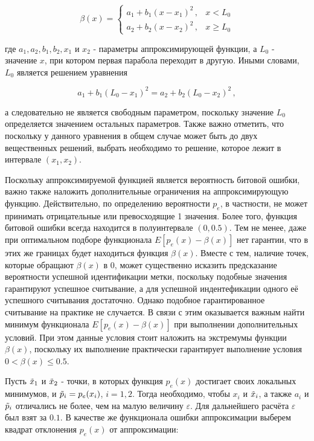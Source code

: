 \documentclass[12pt]{article}
\theoremstyle{definition}
\begin{document}
\begin{equation}
    \beta(x) = \begin{cases}
        a_1+b_1(x-x_1)^2\,, & x<L_0 \\
        a_2+b_2(x-x_2)^2\,, & x\geq L_0
    \end{cases}
\end{equation}

где $a_1, a_2, b_1, b_2, x_1$ и $x_2$ - параметры аппроксимирующей функции, а $L_0$ - значение $x$, при котором первая парабола переходит в другую. Иными словами, $L_0$ является решением уравнения 

\begin{equation}
    a_1+b_1(L_0-x_1)^2 = a_2+b_2(L_0-x_2)^2\,,
\end{equation}

а следовательно не является свободным параметром, поскольку значение $L_0$ определяется значением остальных параметров. Также важно отметить, что поскольку у данного уравнения в общем случае может быть до двух вещественных решений, выбрать необходимо то решение, которое лежит в интервале $(x_1,x_2)$.

Поскольку аппроксимируемой функцией является вероятность битовой ошибки, важно также наложить дополнительные ограничения на аппроксимирующую функцию. Действительно, по определению вероятности $p_e$, в частности, не может принимать отрицательные или превосходящие 1 значения. Более того, функция битовой ошибки всегда находится в полуинтервале $(0,0.5)$. Тем не менее, даже при оптимальном подборе функционала $E[p_e(x)-\beta(x)]$ нет гарантии, что в этих же границах будет находиться функция $\beta(x)$. Вместе с тем, наличие точек, которые обращают $\beta(x)$ в 0, может существенно исказить предсказание вероятности успешной идентификации метки, поскольку подобные значения гарантируют успешное считывание, а для успешной индентефикации одного её успешного считывания достаточно. Однако подобное гарантированное считывание на практике не случается. В связи с этим оказывается важным найти минимум функционала $E[p_e(x)-\beta(x)]$ при выполнении дополнительных условий. При этом данные условия стоит наложить на экстремумы функции $\beta(x)$, поскольку их выполнение практически гарантирует выполнение условия $0<\beta(x)\leq 0.5$. 

Пусть $\Tilde{x}_1$ и $\Tilde{x}_2$ - точки, в которых функция $p_e(x)$ достигает своих локальных минимумов, и $\Tilde{p}_i=p_e(x_i)$, $i=1,2$. Тогда необходимо, чтобы $x_i$ и $\Tilde{x}_i$, а также $a_i$ и $\Tilde{p}_i$ отличались не более, чем на малую величину $\varepsilon$. Для дальнейшего расчёта $\varepsilon$ был взят за $0.1$. В качестве же функционала ошибки аппроксимации выберем квадрат отклонения $p_e(x)$ от аппроксимации:
\end{document}
